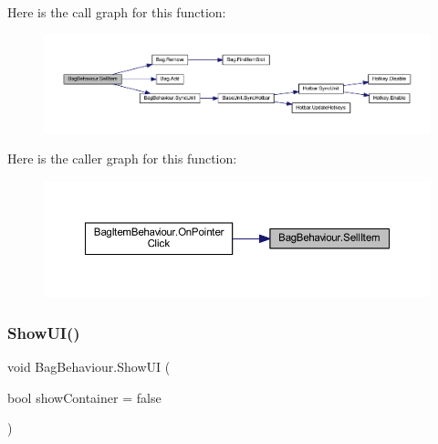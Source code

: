 Here is the call graph for this function\+:
\nopagebreak
\begin{figure}[H]
\begin{center}
\leavevmode
\includegraphics[width=350pt]{class_bag_behaviour_aa0aed3d648b13c1add4c2e2ce2ac9c38_cgraph}
\end{center}
\end{figure}
Here is the caller graph for this function\+:
\nopagebreak
\begin{figure}[H]
\begin{center}
\leavevmode
\includegraphics[width=350pt]{class_bag_behaviour_aa0aed3d648b13c1add4c2e2ce2ac9c38_icgraph}
\end{center}
\end{figure}
\mbox{\label{class_bag_behaviour_aed83310e460fbfb0fa033cfd9fa41ba5}} 
\subsubsection{\texorpdfstring{ShowUI()}{ShowUI()}}
{\footnotesize\ttfamily void Bag\+Behaviour.\+Show\+UI (\begin{DoxyParamCaption}\item[{bool}]{show\+Container = {\ttfamily false} }\end{DoxyParamCaption})}

